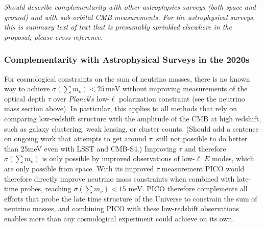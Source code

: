 \documentclass[PICOReport.tex]{subfiles}
\begin{document}
{\it Should describe complementarity with other astrophysics surveys (both space and ground) and with 
sub-orbital CMB measurements.  For the astrophysical surveys, this is summary text of text that is presumably 
sprinkled elsewhere in the proposal; please cross-reference.}

\subsubsection{Complementarity with Astrophysical Surveys in the 2020s}

For cosmological constraints on the sum of neutrino masses, there is no known way to achieve $\sigma(\sum m_\nu)<25\,\mathrm{meV}$ without improving measurements of the optical depth $\tau$ over {\it Planck}'s low-$\ell$ polarization constraint (see the neutrino mass section above).
In particular, this applies to all methods that rely on comparing low-redshift structure with the amplitude of the CMB at high redshift, such as galaxy clustering, weak lensing, or cluster counts.
(Should add a sentence on ongoing work that attempts to get around $\tau$: still not possible to do better than 25meV even with LSST and CMB-S4.)
Improving $\tau$ and therefore $\sigma(\sum m_\nu)$ is only possible by improved observations of low-$\ell$ $E$ modes, which are only possible from space.
With its improved $\tau$ measurement PICO would therefore directly improve neutrino mass constraints when combined with late-time probes, reaching $\sigma(\sum m_\nu)<15$ meV.  
PICO therefore complements all efforts that probe the late time structure of the Universe to constrain the sum of neutrino masses, and combining PICO with these low-redshift observations enables more than any cosmological experiment could achieve on its own.
 
\end{document}
